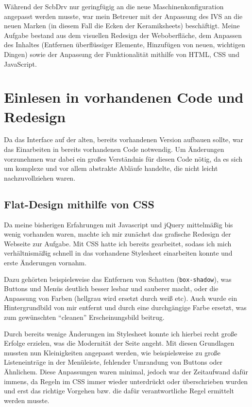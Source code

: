 \documentclass[xcolor=dvipsnames,11pt,paper=a4paper]{report}
\begin{document}
Während der ScbDrv nur geringfügig an die neue Maschinenkonfiguration angepasst
werden musste, war mein Betreuer mit der Anpassung des IVS an die neuen Marken (in
diesem Fall die Ecken der Keramiksheets) beschäftigt. Meine Aufgabe bestand aus
dem visuellen Redesign der Weboberfläche, dem Anpassen des Inhaltes (Entfernen überflüssiger
Elemente, Hinzufügen von neuen, wichtigen Dingen) sowie der Anpassung der Funktionalität
mithilfe von HTML, CSS und JavaScript.



\section{Einlesen in vorhandenen Code und Redesign}

Da das Interface auf der alten, bereits vorhandenen Version aufbauen sollte, war
das Einarbeiten in bereits vorhandenen Code notwendig. Um Änderungen vorzunehmen
war dabei ein großes Verständnis für diesen Code nötig, da es sich um komplexe und
vor allem abstrakte Abläufe handelte, die nicht leicht nachzuvollziehen waren.


\subsection{Flat-Design mithilfe von CSS}

Da meine bisherigen Erfahrungen mit Javascript und jQuery mittelmäßig bis wenig
vorhanden waren, machte ich mir zunächst das grafische Redesign der Webseite zur
Aufgabe. Mit CSS hatte ich bereits gearbeitet, sodass ich mich verhältnismäßig schnell
in das vorhandene Stylesheet einarbeiten konnte und erste Änderungen vornahm.

Dazu gehörten beispielsweise das Entfernen von Schatten (\texttt{box-shadow}), was
Buttons und Menüs deutlich besser lesbar und sauberer macht, oder die Anpassung
von Farben (hellgrau wird ersetzt durch weiß etc). Auch wurde ein Hintergrundbild
von mir entfernt und durch eine durchgängige Farbe ersetzt, was zum gewünschten
``cleanen'' Erscheinungsbild beitrug.

Durch bereits wenige Änderungen im Stylesheet konnte ich hierbei recht große Erfolge
erzielen, was die Modernität der Seite angeht. Mit diesen Grundlagen mussten nun
Kleinigkeiten angepasst werden, wie beispielsweise zu große Listeneinträge in der
Menüleiste, fehlender Umrandung von Buttons oder Ähnlichem. Diese Anpassungen waren
minimal, jedoch war der Zeitaufwand dafür immens, da Regeln im CSS immer wieder
unterdrückt oder überschrieben wurden und erst das richtige Vorgehen bzw. die dafür
verantwortliche Regel ermittelt werden musste.
\end{document}
